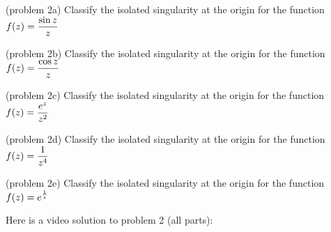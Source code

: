 \documentclass[handout]{ximera}
\begin{document}
\begin{problem}(problem 2a)
Classify the isolated singularity at the origin for the function $\displaystyle f(z) = \frac{\sin z}{z}$
\begin{multipleChoice}
\end{multipleChoice}
\end{problem}


\begin{problem}(problem 2b)
Classify the isolated singularity at the origin for the function $\displaystyle f(z) = \frac{\cos z}{z}$
\begin{multipleChoice}
\end{multipleChoice}\end{problem}


\begin{problem}(problem 2c)
Classify the isolated singularity at the origin for the function $\displaystyle f(z) = \frac{e^z}{z^2}$
\begin{multipleChoice}
\end{multipleChoice}
\end{problem}


\begin{problem}(problem 2d)
Classify the isolated singularity at the origin for the function $\displaystyle f(z) = \frac{1}{z^4}$
\begin{multipleChoice}
\end{multipleChoice}
\end{problem}


\begin{problem}(problem 2e)
Classify the isolated singularity at the origin for the function $\displaystyle f(z) = e^\frac{1}{z}$
\begin{multipleChoice}
\end{multipleChoice}\end{problem}

Here is a video solution to problem 2 (all parts):\\
\begin{foldable}
\end{foldable}
\end{document}
